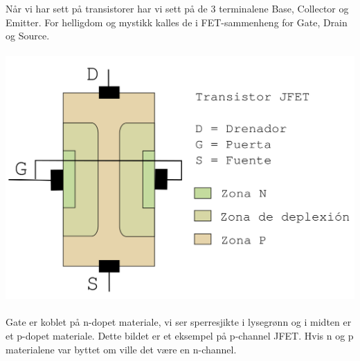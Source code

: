 Når vi har sett på transistorer har vi sett på de 3 terminalene Base, Collector
og Emitter.
For helligdom og mystikk kalles de i FET-sammenheng for Gate, Drain og Source.
\\\\
\includegraphics[width=\textwidth]{./img/jfet}
\\\\
Gate er koblet på n-dopet materiale, vi ser sperresjikte i lysegrønn og
i midten er et p-dopet materiale.
Dette bildet er et eksempel på p-channel JFET.
Hvis n og p materialene var byttet om ville det være en n-channel.
